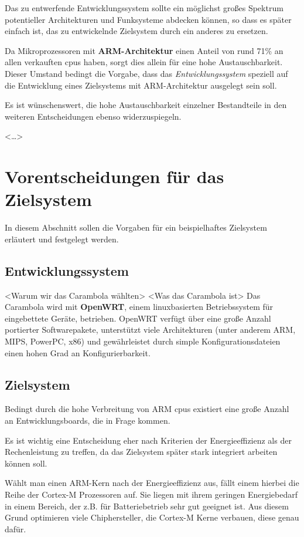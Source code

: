 Das zu entwerfende Entwicklungssystem sollte ein möglichst
großes Spektrum potentieller Architekturen und Funksysteme abdecken können, so
dass es später einfach ist, das zu entwickelnde Zielsystem durch ein anderes zu
ersetzen.

Da Mikroprozessoren mit \textbf{ARM-Architektur} einen Anteil von rund
71\%\cite{IDC01} an allen verkauften \glspl{cpu} haben, sorgt dies allein für
eine hohe Austauschbarkeit. Dieser Umstand bedingt die Vorgabe, dass das
\emph{Entwicklungssystem} speziell auf die Entwicklung eines Zielsystems
mit ARM-Architektur ausgelegt sein soll. 

Es ist wünschenswert, die hohe Austauschbarkeit einzelner Bestandteile in
den weiteren Entscheidungen ebenso widerzuspiegeln.

<\ldots>

\section{Vorentscheidungen für das  Zielsystem} In diesem Abschnitt sollen die
Vorgaben für ein beispielhaftes Zielsystem erläutert und festgelegt werden. 
\subsection{Entwicklungssystem}
<Warum wir das Carambola wählten>
<Was das Carambola ist>
Das Carambola wird mit \textbf{OpenWRT}, einem linuxbasierten
Betriebssystem für eingebettete Geräte, betrieben. OpenWRT verfügt über eine große Anzahl
portierter Softwarepakete, unterstützt viele Architekturen (unter anderem ARM,
MIPS, PowerPC, x86) und gewährleistet durch simple Konfigurationsdateien einen
hohen Grad an Konfigurierbarkeit.
\subsection{Zielsystem}
Bedingt durch die hohe Verbreitung von ARM \glspl{cpu}
existiert eine große Anzahl an Entwicklungsboards, die in Frage kommen.

Es ist wichtig eine Entscheidung eher nach Kriterien der Energieeffizienz als
der Rechenleistung zu treffen, da das Zielsystem später stark integriert
arbeiten können soll.

Wählt man einen ARM-Kern nach der Energieeffizienz aus, fällt einem hierbei die
Reihe der Cortex-M Prozessoren auf. Sie liegen mit ihrem geringen Energiebedarf
in einem Bereich, der z.B. für Batteriebetrieb sehr gut geeignet ist. Aus diesem
Grund optimieren viele Chiphersteller, die Cortex-M Kerne verbauen, diese genau
dafür.

